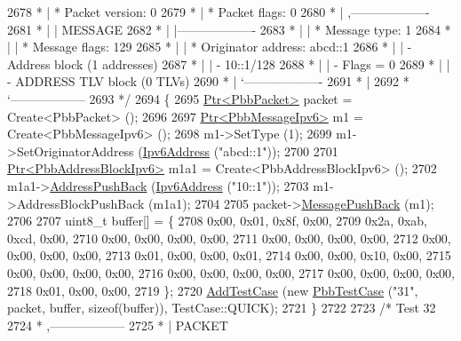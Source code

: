 \begin{DoxyCode}
2678 \textcolor{comment}{         * | * Packet version:    0}
2679 \textcolor{comment}{         * | * Packet flags:  0}
2680 \textcolor{comment}{         * |    ,-------------------}
2681 \textcolor{comment}{         * |    |  MESSAGE}
2682 \textcolor{comment}{         * |    |-------------------}
2683 \textcolor{comment}{         * |    | * Message type:       1}
2684 \textcolor{comment}{         * |    | * Message flags:  129}
2685 \textcolor{comment}{         * |    | * Originator address: abcd::1}
2686 \textcolor{comment}{         * |    | - Address block (1 addresses)}
2687 \textcolor{comment}{         * |    |     - 10::1/128}
2688 \textcolor{comment}{         * |    |     - Flags = 0}
2689 \textcolor{comment}{         * |    | - ADDRESS TLV block (0 TLVs)}
2690 \textcolor{comment}{         * |    `-------------------}
2691 \textcolor{comment}{         * |}
2692 \textcolor{comment}{         * `------------------}
2693 \textcolor{comment}{   */}
2694   \{
2695     \hyperlink{classns3_1_1Ptr}{Ptr<PbbPacket>} packet = Create<PbbPacket> ();
2696 
2697     \hyperlink{classns3_1_1Ptr}{Ptr<PbbMessageIpv6>} m1 = Create<PbbMessageIpv6> ();
2698     m1->SetType (1);
2699     m1->SetOriginatorAddress (\hyperlink{classns3_1_1Ipv6Address}{Ipv6Address} (\textcolor{stringliteral}{"abcd::1"}));
2700 
2701     \hyperlink{classns3_1_1Ptr}{Ptr<PbbAddressBlockIpv6>} m1a1 = Create<PbbAddressBlockIpv6> ();
2702     m1a1->\hyperlink{classns3_1_1PbbAddressBlock_a7be545a53d69bd426dbebcf752ed8371}{AddressPushBack} (\hyperlink{classns3_1_1Ipv6Address}{Ipv6Address} (\textcolor{stringliteral}{"10::1"}));
2703     m1->AddressBlockPushBack (m1a1);
2704 
2705     packet->\hyperlink{classns3_1_1PbbPacket_a4a3170001ef758d9c9c4375b8f089826}{MessagePushBack} (m1);
2706 
2707     uint8\_t buffer[] = \{
2708       0x00, 0x01, 0x8f, 0x00,
2709       0x2a, 0xab, 0xcd, 0x00,
2710       0x00, 0x00, 0x00, 0x00,
2711       0x00, 0x00, 0x00, 0x00,
2712       0x00, 0x00, 0x00, 0x00,
2713       0x01, 0x00, 0x00, 0x01,
2714       0x00, 0x00, 0x10, 0x00,
2715       0x00, 0x00, 0x00, 0x00,
2716       0x00, 0x00, 0x00, 0x00,
2717       0x00, 0x00, 0x00, 0x00,
2718       0x01, 0x00, 0x00,
2719     \};
2720     \hyperlink{classns3_1_1TestCase_a3718088e3eefd5d6454569d2e0ddd835}{AddTestCase} (\textcolor{keyword}{new} \hyperlink{classPbbTestCase}{PbbTestCase} (\textcolor{stringliteral}{"31"}, packet, buffer, \textcolor{keyword}{sizeof}(buffer)), 
      TestCase::QUICK);
2721   \}
2722 
2723   \textcolor{comment}{/* Test 32}
2724 \textcolor{comment}{         * ,------------------}
2725 \textcolor{comment}{         * |  PACKET}

\end{DoxyCode}
